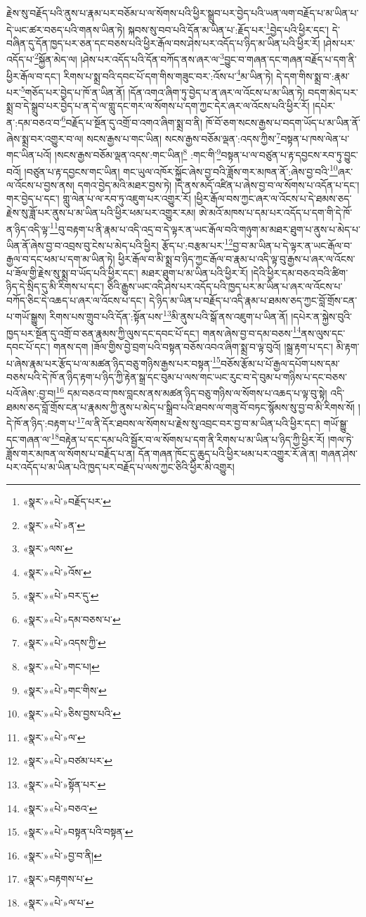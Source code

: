 རྗེས་སུ་བརྗོད་པའི་ནུས་པ་རྣམ་པར་བཅོམ་པ་ལ་སོགས་པའི་ཕྱིར་སྒྲུབ་པར་བྱེད་པའི་ཡན་ལག་བརྗོད་པ་མ་ཡིན་པ་དེ་ཡང་ཚར་བཅད་པའི་གནས་ཡིན་ཏེ། སྐབས་སུ་བབ་པའི་དོན་མ་ཡིན་པ་:རྗོད་པར་\footnote{«སྣར་»«པེ་»བརྗོད་པར་}བྱེད་པའི་ཕྱིར་དང་། དེ་བཞིན་དུ་དོན་ཁྱད་པར་ཅན་དང་བཅས་པའི་ཕྱིར་རྒོལ་བས་ཤེས་པར་འདོད་པ་ཉིད་མ་ཡིན་པའི་ཕྱིར་རོ། །ཤེས་པར་འདོད་པ་\footnote{«སྣར་»«པེ་»ན་}སྐྱོན་མེད་ལ། །ཤེས་པར་འདོད་པའི་དོན་བཀོད་ནས་ཞར་ལ་\footnote{«སྣར་»ལས་}བྱུང་བ་གཞན་དང་གཞན་བརྗོད་པ་དག་ནི་ཕྱིར་རྒོལ་བ་དང་། རིགས་པ་སྨྲ་བའི་དབང་པོ་དག་གིས་གཟུང་བར་:འོས་པ་\footnote{«སྣར་»«པེ་»འོས་}མ་ཡིན་ཏེ། དེ་དག་གིས་སྨྲ་བ་:རྣམ་པར་\footnote{«སྣར་»«པེ་»བར་དུ་}གཅོད་པར་བྱེད་པ་ཁོ་ན་ཡིན་ནོ། །དོན་འགའ་ཞིག་ཏུ་བྱེད་པ་ན་ཞར་ལ་འོངས་པ་མ་ཡིན་ཏེ། བདག་མེད་པར་སྨྲ་བ་དེ་སྒྲུབ་པར་བྱེད་པ་ན་དེ་ལ་གླུ་དང་གར་ལ་སོགས་པ་དག་ཀྱང་དེར་ཞར་ལ་འོངས་པའི་ཕྱིར་རོ། །དཔེར་ན་:དམ་བཅའ་བ་\footnote{«སྣར་»«པེ་»དམ་བཅས་པ་}བརྗོད་པ་སྔོན་དུ་འགྲོ་བ་འགའ་ཞིག་སྨྲ་བ་ནི། ཁོ་བོ་ཅག་སངས་རྒྱས་པ་བདག་ཡོད་པ་མ་ཡིན་ནོ་ཞེས་སྨྲ་བར་འགྱུར་བ་ལ། སངས་རྒྱས་པ་གང་ཡིན། སངས་རྒྱས་བཅོམ་ལྡན་:འདས་ཀྱིས་\footnote{«སྣར་»«པེ་»འདས་ཀྱི་}བསྟན་པ་ཁས་ལེན་པ་གང་ཡིན་པའོ། །སངས་རྒྱས་བཅོམ་ལྡན་འདས་:གང་ཡིན།\footnote{«སྣར་»«པེ་»གང་པ།} :གང་གི་\footnote{«སྣར་»«པེ་»གང་གིས་}བསྟན་པ་ལ་བཙུན་པ་རྟ་དབྱངས་རབ་ཏུ་བྱུང་བའོ། །བཙུན་པ་རྟ་དབྱངས་གང་ཡིན། གང་ཡུལ་འཁོར་སྐྱོང་ཞེས་བྱ་བའི་ཟློས་གར་མཁན་ནོ་:ཞེས་བྱ་བའི་\footnote{«སྣར་»«པེ་»ཅིས་བྱས་པའི་}ཞར་ལ་འོངས་པ་བྱས་ནས། དགའ་བྱེད་མའི་མཐར་བྱས་ཏེ། །དེ་ནས་མདོ་འཛིན་པ་ཞེས་བྱ་བ་ལ་སོགས་པ་འདོན་པ་དང་། གར་བྱེད་པ་དང་། གླུ་ལེན་པ་ལ་རབ་ཏུ་འཇུག་པར་འགྱུར་རོ། །ཕྱིར་རྒོལ་བས་ཀྱང་ཞར་ལ་འོངས་པ་དེ་ཐམས་ཅད་རྗེས་སུ་ཟློ་པར་ནུས་པ་མ་ཡིན་པའི་ཕྱིར་ཕམ་པར་འགྱུར་རམ། ཨེ་མའོ་མཁས་པ་དམ་པར་འདོད་པ་དག་གི་དེ་ཁོ་ན་ཉིད་འདི་ལྟ་\footnote{«སྣར་»«པེ་»ལ་}བུ་བརྟག་པ་ནི་རྣམ་པ་འདི་འདྲ་བ་དེ་ལྟར་ན་ཡང་རྒོལ་བའི་གཉུག་མ་མཐར་ཐུག་པ་ནུས་པ་མེད་པ་ཡིན་ནོ་ཞེས་བྱ་བ་འབྲས་བུ་ངེས་པ་མེད་པའི་ཕྱིར། རྩོད་པ་:བརྩམ་པར་\footnote{«སྣར་»«པེ་»བཙམ་པར་}བྱ་བ་མ་ཡིན་པ་དེ་ལྟར་ན་ཡང་རྒོལ་བ་རྒྱལ་བ་དང་ཕམ་པ་དག་མ་ཡིན་ཏེ། ཕྱིར་རྒོལ་བ་མི་སྨྲ་བ་ཉིད་ཀྱང་རྒོལ་བ་རྣམ་པ་འདི་ལྟ་བུ་རྒྱས་པ་ཞར་ལ་འོངས་པ་ཟོལ་གྱི་རྗེས་སུ་སྨྲ་བ་ཡོད་པའི་ཕྱིར་དང་། མཐར་ཐུག་པ་མ་ཡིན་པའི་ཕྱིར་རོ། །དེའི་ཕྱིར་དམ་བཅའ་བའི་ཚིག་ཉིད་དེ་སྲིད་དུ་མི་རིགས་པ་དང་། ཅིའི་རྒྱུས་ཡང་འདི་ཤེས་པར་འདོད་པའི་ཁྱད་པར་མ་ཡིན་པ་ཞར་ལ་འོངས་པ་བཀོད་ཅིང་དེ་འཆད་པ་ཞར་ལ་འོངས་པ་དང་། དེ་ཉིད་མ་ཡིན་པ་བརྗོད་པ་འདི་རྣམ་པ་ཐམས་ཅད་ཀྱང་བློ་གྲོས་ངན་པ་གཡོ་སྒྱུས། རིགས་པས་གྲུབ་པའི་དོན་:སྟོན་པས་\footnote{«སྣར་»«པེ་»སྟོན་པར་}མི་ནུས་པའི་སྒོ་ནས་འཇུག་པ་ཡིན་ནོ། །དཔེར་ན་སྐྱེས་བུའི་ཁྱད་པར་སྔོན་དུ་འགྲོ་བ་ཅན་རྣམས་ཀྱི་ལུས་དང་དབང་པོ་དང་། གནས་ཞེས་བྱ་བ་དམ་བཅས་\footnote{«སྣར་»«པེ་»བཅའ་}ནས་ལུས་དང་དབང་པོ་དང་། གནས་དག །ཟོལ་གྱིས་བྱེ་བྲག་པའི་བསྟན་བཅོས་འབའ་ཞིག་སྨྲ་བ་ལྟ་བུའོ། །སྒྲ་རྟག་པ་དང་། མི་རྟག་པ་ཞེས་རྣམ་པར་རྩོད་པ་ལ་མཚན་ཉིད་བཅུ་གཉིས་རྒྱས་པར་བསྟན་\footnote{«སྣར་»«པེ་»བསྟན་པའི་བསྟན་}བཅོས་རྩོམ་པ་པོ་རྒྱལ་དཔོག་པས་དམ་བཅས་པའི་དེ་ཁོ་ན་ཉིད་རྟག་པ་ཉིད་ཀྱི་རྟེན་སྒྲ་དང་བུམ་པ་ལས་གང་ཡང་རུང་བ་དེ་བུམ་པ་གཉིས་པ་དང་བཅས་པའོ་ཞེས་:བྱ་བ།\footnote{«སྣར་»«པེ་»བྱ་བ་ནི།} དམ་བཅའ་བ་ཁས་བླངས་ནས་མཚན་ཉིད་བཅུ་གཉིས་ལ་སོགས་པ་འཆད་པ་ལྟ་བུ་སྟེ། འདི་ཐམས་ཅད་བློ་གྲོས་ངན་པ་རྣམས་ཀྱི་ནུས་པ་མེད་པ་སྒྲིབ་པའི་ཐབས་ལ་གཟུ་བོ་བཏང་སྙོམས་སུ་བྱ་བ་མི་རིགས་སོ། །དེ་ཁོ་ན་ཉིད་:བརྟག་པ་\footnote{«སྣར་»བརྟགས་པ་}ལ་ནི་དོར་ཐབས་ལ་སོགས་པ་རྗེས་སུ་འབྲང་བར་བྱ་བ་མ་ཡིན་པའི་ཕྱིར་དང་། གཡོ་སྒྱུ་དང་གཞན་ལ་\footnote{«སྣར་»«པེ་»ལ་པ་}བརྟེན་པ་དང་དམ་པའི་སྦྱོར་བ་ལ་སོགས་པ་དག་ནི་རིགས་པ་མ་ཡིན་པ་ཉིད་ཀྱི་ཕྱིར་རོ། །གལ་ཏེ་ཟློས་གར་མཁན་ལ་སོགས་པ་བརྗོད་པ་ན། དོན་གཞན་ཁོང་དུ་ཆུད་པའི་ཕྱིར་ཕམ་པར་འགྱུར་རོ་ཞེ་ན། གཞན་ཤེས་པར་འདོད་པ་མ་ཡིན་པའི་ཁྱད་པར་བརྗོད་པ་ལས་ཀྱང་ཅིའི་ཕྱིར་མི་འགྱུར། 